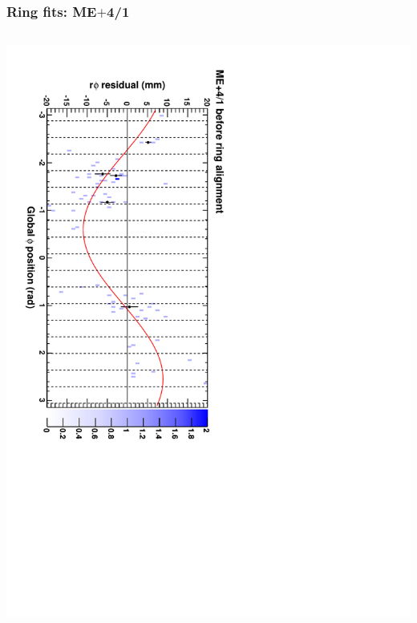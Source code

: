 \documentclass[compress]{beamer}
\begin{document}
\begin{frame}
\frametitle{Ring fits: ME$+$4/1}
\vfill
\begin{columns}
\includegraphics[height=\linewidth, angle=90]{ringfits_before/mep41.pdf}


\end{columns}
\end{frame}
\end{document}
